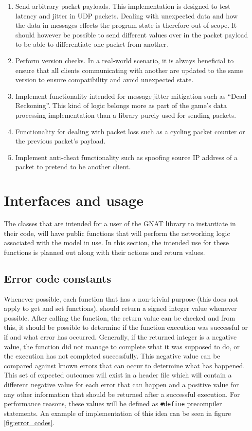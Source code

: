 \begin{enumerate}
\item Send arbitrary packet payloads. This implementation is designed to test latency and jitter in UDP packets. Dealing with unexpected data and how the data in messages effects the program state is therefore out of scope. It should however be possible to send different values over in the packet payload to be able to differentiate one packet from another.
\item Perform version checks. In a real-world scenario, it is always beneficial to ensure that all clients communicating with another are updated to the same version to ensure compatibility and avoid unexpected state.
\item Implement functionality intended for message jitter mitigation such as ``Dead Reckoning''. This kind of logic belongs more as part of the game's data processing implementation than a library purely used for sending packets.
\item Functionality for dealing with packet loss such as a cycling packet counter or the previous packet's payload.
\item Implement anti-cheat functionality such as spoofing source IP address of a packet to pretend to be another client.
\end{enumerate}

\newpage
\section{Interfaces and usage}
The classes that are intended for a user of the GNAT library to instantiate in their code, will have public functions that will perform the networking logic associated with the model in use. In this section, the intended use for these functions is planned out along with their actions and return values.

\subsection{Error code constants}
Whenever possible, each function that has a non-trivial purpose (this does not apply to get and set functions), should return a signed integer value whenever possible. After calling the function, the return value can be checked and from this, it should be possible to determine if the function execution was successful or if and what error has occurred. Generally, if the returned integer is a negative value, the function did not manage to complete what it was supposed to do, or the execution has not completed successfully. This negative value can be compared against known errors that can occur to determine what has happened. This set of expected outcomes will exist in a header file which will contain a different negative value for each error that can happen and a positive value for any other information that should be returned after a successful execution. For performance reasons, these values will be defined as \lstinline{#define} precompiler statements. An example of implementation of this idea can be seen in figure \ref{fig:error_codes}.

